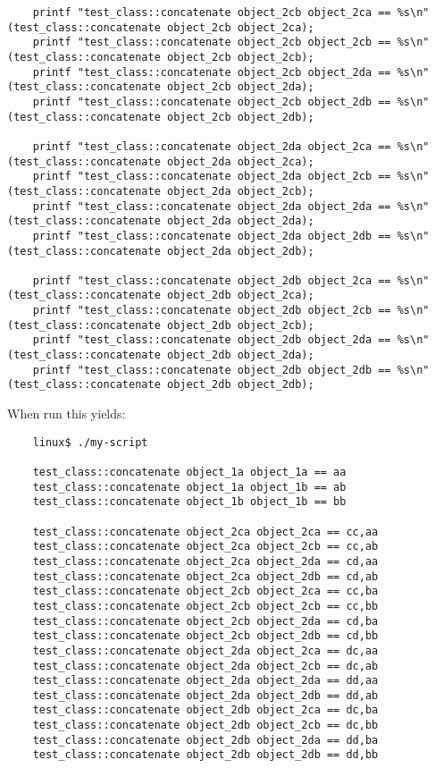 \begin{verbatim}
    printf "test_class::concatenate object_2cb object_2ca == %s\n" (test_class::concatenate object_2cb object_2ca);
    printf "test_class::concatenate object_2cb object_2cb == %s\n" (test_class::concatenate object_2cb object_2cb);
    printf "test_class::concatenate object_2cb object_2da == %s\n" (test_class::concatenate object_2cb object_2da);
    printf "test_class::concatenate object_2cb object_2db == %s\n" (test_class::concatenate object_2cb object_2db);

    printf "test_class::concatenate object_2da object_2ca == %s\n" (test_class::concatenate object_2da object_2ca);
    printf "test_class::concatenate object_2da object_2cb == %s\n" (test_class::concatenate object_2da object_2cb);
    printf "test_class::concatenate object_2da object_2da == %s\n" (test_class::concatenate object_2da object_2da);
    printf "test_class::concatenate object_2da object_2db == %s\n" (test_class::concatenate object_2da object_2db);

    printf "test_class::concatenate object_2db object_2ca == %s\n" (test_class::concatenate object_2db object_2ca);
    printf "test_class::concatenate object_2db object_2cb == %s\n" (test_class::concatenate object_2db object_2cb);
    printf "test_class::concatenate object_2db object_2da == %s\n" (test_class::concatenate object_2db object_2da);
    printf "test_class::concatenate object_2db object_2db == %s\n" (test_class::concatenate object_2db object_2db);
\end{verbatim}

When run this yields:

\begin{verbatim}
    linux$ ./my-script

    test_class::concatenate object_1a object_1a == aa
    test_class::concatenate object_1a object_1b == ab
    test_class::concatenate object_1b object_1b == bb

    test_class::concatenate object_2ca object_2ca == cc,aa
    test_class::concatenate object_2ca object_2cb == cc,ab
    test_class::concatenate object_2ca object_2da == cd,aa
    test_class::concatenate object_2ca object_2db == cd,ab
    test_class::concatenate object_2cb object_2ca == cc,ba
    test_class::concatenate object_2cb object_2cb == cc,bb
    test_class::concatenate object_2cb object_2da == cd,ba
    test_class::concatenate object_2cb object_2db == cd,bb
    test_class::concatenate object_2da object_2ca == dc,aa
    test_class::concatenate object_2da object_2cb == dc,ab
    test_class::concatenate object_2da object_2da == dd,aa
    test_class::concatenate object_2da object_2db == dd,ab
    test_class::concatenate object_2db object_2ca == dc,ba
    test_class::concatenate object_2db object_2cb == dc,bb
    test_class::concatenate object_2db object_2da == dd,ba
    test_class::concatenate object_2db object_2db == dd,bb
\end{verbatim}

